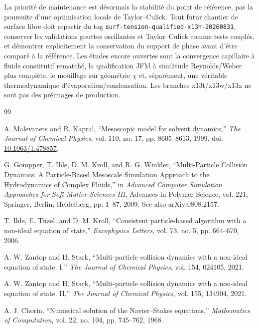 \documentclass[11pt,a4paper]{article}
\begin{document}
La priorité de maintenance est désormais la stabilité du point de référence, pas la poursuite d'une optimisation locale de Taylor--Culick. Tout futur chantier de surface libre doit repartir du tag \texttt{surf-tension-qualified-x13h-20260831}, conserver les validations gouttes oscillantes et Taylor--Culick comme tests couplés, et démontrer explicitement la conservation du support de phase avant d'être comparé à la référence. Les études encore ouvertes sont la convergence capillaire à fluide constitutif rematché, la qualification JFM à similitude Reynolds/Weber plus complète, le mouillage sur géométrie $\chi$ et, séparément, une véritable thermodynamique d'évaporation/condensation. Les branches x13t/x13w/x13x ne sont pas des préimages de production.




\begin{thebibliography}{99}

A. Malevanets and R. Kapral,
``Mesoscopic model for solvent dynamics,''
\emph{The Journal of Chemical Physics}, vol. 110, no. 17, pp. 8605--8613, 1999.
doi: \href{https://doi.org/10.1063/1.478857}{10.1063/1.478857}.

G. Gompper, T. Ihle, D. M. Kroll, and R. G. Winkler,
``Multi-Particle Collision Dynamics: A Particle-Based Mesoscale Simulation Approach to the Hydrodynamics of Complex Fluids,''
in \emph{Advanced Computer Simulation Approaches for Soft Matter Sciences III},
Advances in Polymer Science, vol. 221, Springer, Berlin, Heidelberg, pp. 1--87, 2009.
See also arXiv:0808.2157.

T. Ihle, E. Tüzel, and D. M. Kroll,
``Consistent particle-based algorithm with a non-ideal equation of state,''
\emph{Europhysics Letters}, vol. 73, no. 5, pp. 664--670, 2006.

A. W. Zantop and H. Stark,
``Multi-particle collision dynamics with a non-ideal equation of state. I,''
\emph{The Journal of Chemical Physics}, vol. 154, 024105, 2021.

A. W. Zantop and H. Stark,
``Multi-particle collision dynamics with a non-ideal equation of state. II,''
\emph{The Journal of Chemical Physics}, vol. 155, 134904, 2021.

A. J. Chorin,
``Numerical solution of the Navier--Stokes equations,''
\emph{Mathematics of Computation}, vol. 22, no. 104, pp. 745--762, 1968.


\end{thebibliography}
\end{document}
